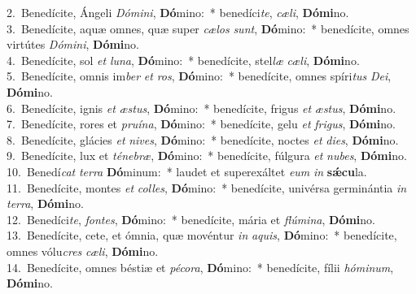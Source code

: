 {2.~}Benedícite, Ángeli \textit{Dó}\textit{mi}\textit{ni}, \textbf{Dó}mino:~* benedíci\textit{te}, \textit{cæ}\textit{li}, \textbf{Dó}\textbf{mi}no.\\
{3.~}Benedícite, aquæ omnes, quæ super \textit{cæ}\textit{los} \textit{sunt}, \textbf{Dó}mino:~* benedícite, omnes virtútes \textit{Dó}\textit{mi}\textit{ni}, \textbf{Dó}\textbf{mi}no.\\
{4.~}Benedícite, sol \textit{et} \textit{lu}\textit{na}, \textbf{Dó}mino:~* benedícite, stel\textit{læ} \textit{cæ}\textit{li}, \textbf{Dó}\textbf{mi}no.\\
{5.~}Benedícite, omnis im\textit{ber} \textit{et} \textit{ros}, \textbf{Dó}mino:~* benedícite, omnes spíri\textit{tus} \textit{De}\textit{i}, \textbf{Dó}\textbf{mi}no.\\
{6.~}Benedícite, ignis \textit{et} \textit{æ}\textit{stus}, \textbf{Dó}mino:~* benedícite, frigus \textit{et} \textit{æ}\textit{stus}, \textbf{Dó}\textbf{mi}no.\\
{7.~}Benedícite, rores et \textit{pru}\textit{í}\textit{na}, \textbf{Dó}mino:~* benedícite, gelu \textit{et} \textit{fri}\textit{gus}, \textbf{Dó}\textbf{mi}no.\\
{8.~}Benedícite, glácies \textit{et} \textit{ni}\textit{ves}, \textbf{Dó}mino:~* benedícite, noctes \textit{et} \textit{di}\textit{es}, \textbf{Dó}\textbf{mi}no.\\
{9.~}Benedícite, lux et \textit{té}\textit{ne}\textit{bræ}, \textbf{Dó}mino:~* benedícite, fúlgura \textit{et} \textit{nu}\textit{bes}, \textbf{Dó}\textbf{mi}no.\\
{10.~}Benedí\textit{cat} \textit{ter}\textit{ra} \textbf{Dó}minum:~* laudet et superexáltet \textit{e}\textit{um} \textit{in} \textbf{sǽ}\textbf{cu}la.\\
{11.~}Benedícite, montes \textit{et} \textit{col}\textit{les}, \textbf{Dó}mino:~* benedícite, univérsa germinántia \textit{in} \textit{ter}\textit{ra}, \textbf{Dó}\textbf{mi}no.\\
{12.~}Benedíci\textit{te}, \textit{fon}\textit{tes}, \textbf{Dó}mino:~* benedícite, mária et \textit{flú}\textit{mi}\textit{na}, \textbf{Dó}\textbf{mi}no.\\
{13.~}Benedícite, cete, et ómnia, quæ movéntur \textit{in} \textit{a}\textit{quis}, \textbf{Dó}mino:~* benedícite, omnes vólu\textit{cres} \textit{cæ}\textit{li}, \textbf{Dó}\textbf{mi}no.\\
{14.~}Benedícite, omnes béstiæ et \textit{pé}\textit{co}\textit{ra}, \textbf{Dó}mino:~* benedícite, fílii \textit{hó}\textit{mi}\textit{num}, \textbf{Dó}\textbf{mi}no.\\
